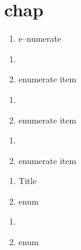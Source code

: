 \documentclass{book}
\renewcommand{\_}{\GNUTexinfounderscore\discretionary{}{}{}}
\begin{document}
\label{anchor:Top}%
\chapter{{chap}}
\label{anchor:chapter}%

\begin{enumerate}[start=1]

\item e--numerate
\end{enumerate}

\begin{enumerate}[start=1]
\item 
{}%

\item enumerate item
\end{enumerate}

\begin{enumerate}[start=1]
\item 
{}%
\item enumerate item
\end{enumerate}

\begin{enumerate}[start=1]
\item {}%

\item enumerate item
\end{enumerate}

\begin{enumerate}[start=1]
\item Title
%
\item enum
\end{enumerate}

\begin{enumerate}[start=1]
\item {}%
%
%
\item enum
\end{enumerate}
\end{document}
